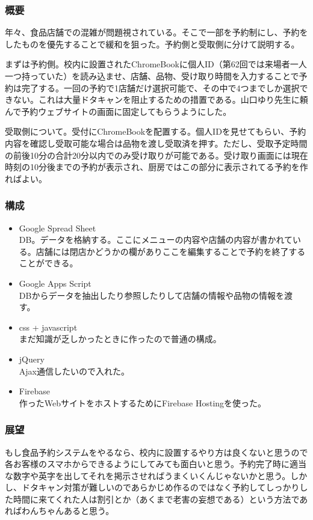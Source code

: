 \documentclass[dvipdfmx,jb5]{jarticle}
\begin{document}
 \subsubsection{概要}
 年々、食品店舗での混雑が問題視されている。そこで一部を予約制にし、予約をしたものを優先することで緩和を狙った。予約側と受取側に分けて説明する。

 まずは予約側。校内に設置されたChromeBookに個人ID（第62回では来場者一人一つ持っていた）を読み込ませ、店舗、品物、受け取り時間を入力することで予約は完了する。一回の予約で1店舗だけ選択可能で、その中で4つまでしか選択できない。これは大量ドタキャンを阻止するための措置である。山口ゆり先生に頼んで予約ウェブサイトの画面に固定してもらうようにした。

 受取側について。受付にChromeBookを配置する。個人IDを見せてもらい、予約内容を確認し受取可能な場合は品物を渡し受取済を押す。ただし、受取予定時間の前後10分の合計20分以内でのみ受け取りが可能である。受け取り画面には現在時刻の10分後までの予約が表示され、厨房ではこの部分に表示されてる予約を作ればよい。

 \subsubsection{構成}
 \begin{itemize}
  \item Google Spread Sheet\\
  DB。データを格納する。ここにメニューの内容や店舗の内容が書かれている。店舗には閉店かどうかの欄がありここを編集することで予約を終了することができる。
   \item Google Apps Script\\
   DBからデータを抽出したり参照したりして店舗の情報や品物の情報を渡す。
   \item css + javascript\\
   まだ知識が乏しかったときに作ったので普通の構成。
   \item jQuery\\
   Ajax通信したいので入れた。
   \item Firebase\\
   作ったWebサイトをホストするためにFirebase Hostingを使った。
  \end{itemize}
 \subsubsection{展望}
 もし食品予約システムをやるなら、校内に設置するやり方は良くないと思うので各お客様のスマホからできるようにしてみても面白いと思う。予約完了時に適当な数字や英字を出してそれを掲示させればうまくいくんじゃないかと思う。しかし、ドタキャン対策が難しいのであらかじめ作るのではなく予約してしっかりした時間に来てくれた人は割引とか（あくまで老害の妄想である）という方法であればわんちゃんあると思う。
\end{document}
